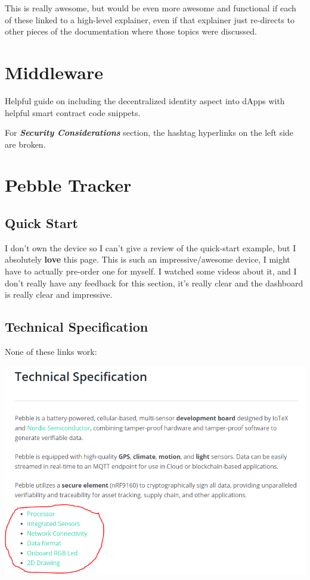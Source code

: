 \documentclass[
]{book}
\begin{document}
This is really awesome, but would be even more awesome and functional if
each of these linked to a high-level explainer, even if that explainer
just re-directs to other pieces of the documentation where those topics
were discussed.

\hypertarget{middleware}{%
\chapter{Middleware}\label{middleware}}

Helpful guide on including the decentralized identity aspect into dApps
with helpful smart contract code snippets.

For \textbf{\emph{Security Considerations}} section, the hashtag
hyperlinks on the left side are broken.

\hypertarget{pebble-tracker}{%
\chapter{Pebble Tracker}\label{pebble-tracker}}

\hypertarget{quick-start}{%
\section{Quick Start}\label{quick-start}}

I don't own the device so I can't give a review of the quick-start
example, but I absolutely \textbf{love} this page. This is such an
impressive/awesome device, I might have to actually pre-order one for
myself. I watched some videos about it, and I don't really have any
feedback for this section, it's really clear and the dashboard is really
clear and impressive.

\hypertarget{technical-specification}{%
\section{Technical Specification}\label{technical-specification}}

None of these links work:

\includegraphics{images/technical_specification_missing_links.PNG}
\end{document}
